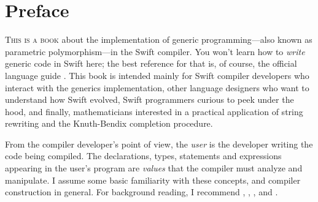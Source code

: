 \documentclass[../generics]{subfiles}
\begin{document}
\chapter*{Preface}


\lettrine{T}{his is a book} about the implementation of generic programming---also known as parametric polymorphism---in the Swift compiler. You won't learn how to \emph{write} generic code in Swift here; the best reference for that is, of course, the official language guide \cite{tspl}. This book is intended mainly for Swift compiler developers who interact with the generics implementation, other language designers who want to understand how Swift evolved, Swift programmers curious to peek under the hood, and finally, mathematicians interested in a practical application of string rewriting and the Knuth-Bendix completion procedure.

From the compiler developer's point of view, the \emph{user} is the developer writing the code being compiled. The declarations, types, statements and expressions appearing in the user's program are \emph{values} that the compiler must analyze and manipulate. I assume some basic familiarity with these concepts, and compiler construction in general. For background reading, I recommend \cite{muchnick1997advanced}, \cite{cooper2004engineering}, \cite{craftinginterpreter}, and \cite{incrementalracket}.
\end{document}
